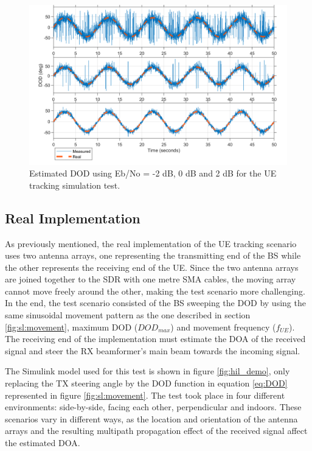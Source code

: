 \documentclass[12pt,a4paper]{report}
\begin{document}
\begin{figure}[h]
    \centering
    \includegraphics[width = \textwidth]{Figures/test_sim_dod_snr.png}
    \caption[Measured DOD for the UE tracking simulation test.]{Estimated DOD using Eb/No = -2 dB, 0 dB and 2 dB for the UE tracking simulation test.}
    \label{fig:test:sim:dod}
\end{figure}

\subsection{Real Implementation} \label{test:ue:real}
As previously mentioned, the real implementation of the UE tracking scenario uses two antenna arrays, one representing the transmitting end of the BS while the other represents the receiving end of the UE. Since the two antenna arrays are joined together to the SDR with one metre SMA cables, the moving array cannot move freely around the other, making the test scenario more challenging. In the end, the test scenario consisted of the BS sweeping the DOD by using the same sinusoidal movement pattern as the one described in section \ref{fig:sl:movement}, maximum DOD ($DOD_{max}$) and movement frequency ($f_{UE}$). The receiving end of the implementation must estimate the DOA of the received signal and steer the RX beamformer's main beam towards the incoming signal. 

The Simulink model used for this test is shown in figure \ref{fig:hil_demo}, only replacing the TX steering angle by the DOD function in equation \ref{eq:DOD} represented in figure \ref{fig:sl:movement}. The test took place in four different environments: side-by-side, facing each other, perpendicular and indoors. These scenarios vary in different ways, as the location and orientation of the antenna arrays and the resulting multipath propagation effect of the received signal affect the estimated DOA. 
\end{document}
